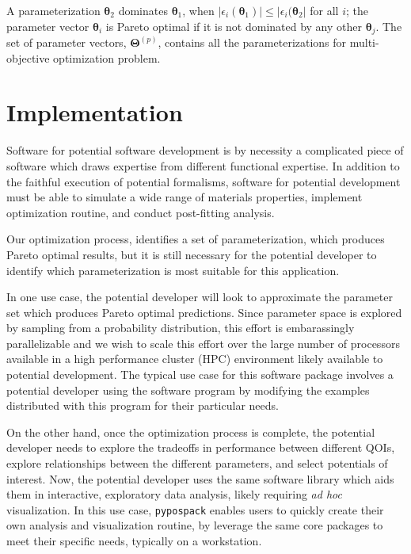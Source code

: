 A parameterization $\bm{\theta}_2$ dominates $\bm{\theta}_1$,
when $\lvert \epsilon_i(\bm{\theta}_1) \rvert \leq  \lvert \epsilon_i(\bm{\theta}_2 \rvert$ for all $i$; the parameter vector $\bm{\theta}_i$ is Pareto optimal if it is not dominated by any other $\bm{\theta}_j$.  The set of parameter vectors, $\bm{\Theta}^{(p)}$, contains all the parameterizations for multi-objective optimization problem.
\section{Implementation}

Software for potential software development is by necessity a complicated piece of software which draws expertise from different functional expertise.
In addition to the faithful execution of potential formalisms, software for potential development must be able to simulate a wide range of materials properties, implement optimization routine, and conduct post-fitting analysis.

Our optimization process, identifies a set of parameterization, which produces Pareto optimal results, but it is still necessary for the potential developer to identify which parameterization is most suitable for this application.

In one use case, the potential developer will look to approximate the parameter set which produces Pareto optimal predictions.  Since parameter space is explored by sampling from a probability distribution, this effort is embarassingly parallelizable and we wish to scale this effort over the large number of processors available in a high performance cluster (HPC) environment likely available to potential development.  The typical use case for this software package involves a potential developer using the software program by modifying the examples distributed with this program for their particular needs.

On the other hand, once the optimization process is complete, the potential developer needs to explore the tradeoffs in performance between different QOIs, explore relationships between the different parameters, and select potentials of interest.
Now, the potential developer uses the same software library which aids them in interactive, exploratory data analysis, likely requiring \emph{ad hoc} visualization.
In this use case, \verb|pypospack| enables users to quickly create their own analysis and visualization routine, by leverage the same core packages to meet their specific needs, typically on a workstation.

